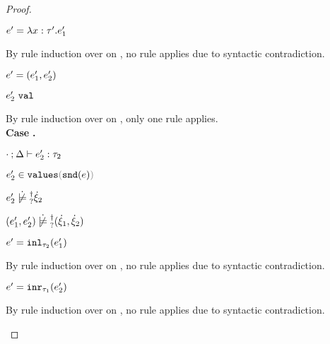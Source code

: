 \begin{proof}
\begin{byCases}
\begin{byCases}
\begin{byCases}
\begin{byCases}
\begin{byCases}
\begin{byCases}
\begin{byCases}
\begin{pfsteps*}
                \item $e'=\lambda x:\tau'.e_1'$ 
                \end{pfsteps*}
                By rule induction over  on , no rule applies due to syntactic contradiction.
                \item[\text{(\ref{rule:VPair})}] 
                \begin{pfsteps*} 
                \item $e'=(e_1' , e_2')$ 
                \item $e_2' ~\mathtt{val}$  
                \end{pfsteps*}
                By rule induction over  on , only one rule applies. \\
                  \textbf{Case} \text{(\ref{rule:TPair})}\textbf{.}
                  \begin{pfsteps*}
                  \item $\cdot \mathbin{;} \Delta \vdash e_2' : \tau_2$  
                  \item $\inValues{e_2'}{\hsnd{e}}$  
                  \item $\cnotsatisfyormay{e_2'}{\hxi_2}$  
                  \item $\cnotsatisfyormay{\hpair{e_1'}{e_2'}}{\cpair{\hxi_1}{\hxi_2}}$ 
                  \end{pfsteps*}
                \item[\text{(\ref{rule:VInl})}] 
                \begin{pfsteps*} 
                \item $e'=\mathtt{inl}_{\tau_2}({e_1'})$ 
                \end{pfsteps*}
                By rule induction over  on , no rule applies due to syntactic contradiction.
                \item[\text{(\ref{rule:VInr})}] 
                \begin{pfsteps*} 
                \item $e'=\mathtt{inr}_{\tau_1}({e_2'})$ 
                \end{pfsteps*}
                By rule induction over  on , no rule applies due to syntactic contradiction.
              \end{byCases}
            \end{byCases}
          \end{byCases}


\end{byCases}
\end{byCases}
\end{byCases}
\end{byCases}
\end{proof}
